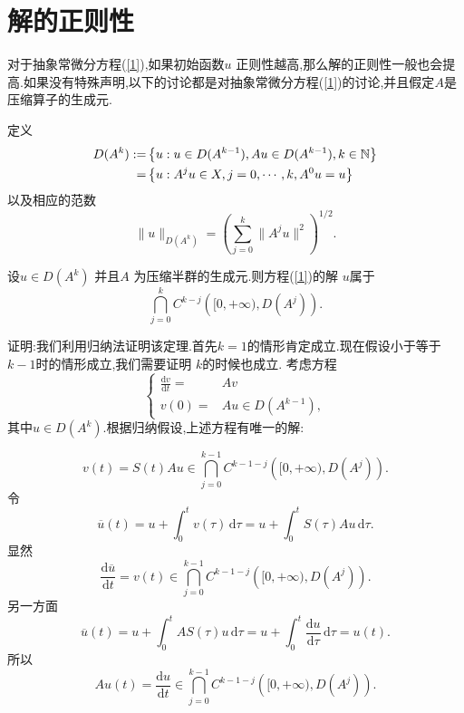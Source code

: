 \section{解的正则性}
  对于抽象常微分方程(\ref{1}),如果初始函数$u$ 正则性越高,那么解的正则性一般也会提高.如果没有特殊声明,以下的讨论都是对抽象常微分方程(\ref{1})的讨论,并且假定$A$是压缩算子的生成元.
\begin{definition}
 定义
  \begin{equation}
   \begin{aligned}
     D(A^{k}):= & \left\{u:u\in D(A^{k-1}),Au\in D(A^{k-1}),k\in \mathbb{N}\right\} \\
     =& \left\{u: A^{j}u \in  X,j=0,\cdots,k,A^{0}u=u\right\}
   \end{aligned}
 \end{equation}
 以及相应的范数
 \begin{equation}
   \|u\|_{D(A^{k})}=\left( \sum_{j=0}^{k} \|A^{j}u\|^2 \right) ^{1 /2}.
 \end{equation}
\end{definition}
  \begin{theorem}
    设$u\in D(A^{k})$ 并且$A$ 为压缩半群的生成元.则方程{\normalfont(\ref{1})}的解 $u$属于
     \[
       \bigcap_{j=0} ^{k}C^{k-j}\left( [0,+\infty),D(A^{j}) \right) .
    \] 
  \end{theorem}
  证明:我们利用归纳法证明该定理.首先$k=1$的情形肯定成立.现在假设小于等于$k-1$时的情形成立,我们需要证明 $k$的时候也成立.
  考虑方程
   \begin{equation}
    \left\{
      \begin{aligned}
      \frac{\mathrm{d}{v}}{\mathrm{d}t}=&A {v}\\
      {v}(0)=&Au \in D(A^{k-1}),
    \end{aligned}
      \right.
  \end{equation}
  其中$u\in  D(A^{k})$.根据归纳假设,上述方程有唯一的解:
   

  \begin{equation}
    {v}(t)=S(t)Au \in \bigcap_{j=0} ^{k-1}C^{k-1-j}\left( [0,+\infty),D(A^{j}) \right) .
  \end{equation}
 令
  \begin{equation}
    \overline{u}(t)=u+\int_0^{t}v(\tau )\,\mathrm{d}\tau =u+\int_0^{t}S(\tau )Au\,\mathrm{d}\tau .
 \end{equation}
 显然
 \begin{equation}
   \frac{\mathrm{d} \overline{u}}{\mathrm{d}t}=v(t) \in  \bigcap_{j=0} ^{k-1}C^{k-1-j}\left( [0,+\infty),D(A^{j}) \right) .
 \end{equation}
 另一方面
\begin{equation}
  \overline{u}(t)=u+\int_0^{t}AS(\tau )u\,\mathrm{d}\tau =u+\int_0^{t}\frac{\mathrm{d}u}{\mathrm{d}\tau }\,\mathrm{d}\tau =u(t).
\end{equation}
所以
\begin{equation}
  Au(t)=\frac{\mathrm{d}u}{\mathrm{d}t} \in  \bigcap_{j=0} ^{k-1}C^{k-1-j}\left( [0,+\infty),D(A^{j}) \right) .	 
\end{equation}



